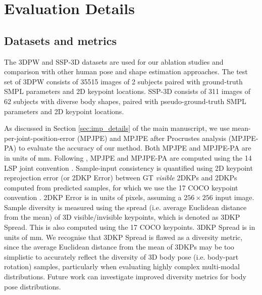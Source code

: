 \section{Evaluation Details}
\label{sec:supmat_eval_details}

\subsection{Datasets and metrics}

The 3DPW \cite{vonMarcard2018} and SSP-3D \cite{STRAPS2020BMVC} datasets are used for our ablation studies and comparison with other human pose and shape estimation approaches. The test set of 3DPW consists of 35515 images of 2 subjects paired with ground-truth SMPL parameters and 2D keypoint locations. SSP-3D consists of 311 images of 62 subjects with diverse body shapes, paired with pseudo-ground-truth SMPL parameters and 2D keypoint locations.

As discussed in Section \ref{sec:imp_details} of the main manuscript, we use mean-per-joint-position-error (MPJPE) and MPJPE after Procrustes analysis (MPJPE-PA) to evaluate the accuracy of our method. Both MPJPE and MPJPE-PA are in units of mm. Following \cite{hmrKanazawa17, kolotouros2019spin, kolotouros2019cmr, kolotouros2021prohmr}, MPJPE and MPJPE-PA are computed using the 14 LSP joint convention \cite{Johnson11lsp}. Sample-input consistency is quantified using 2D keypoint reprojection error (or 2DKP Error) between GT \textit{visible} 2DKPs and 2DKPs computed from predicted samples, for which we use the 17 COCO keypoint convention \cite{Lin2014MicrosoftCC}. 2DKP Error is in units of pixels, assuming a $256 \times 256$ input image. Sample diversity is measured using the spread (i.e. average Euclidean distance from the mean) of 3D visible/invisible keypoints, which is denoted as 3DKP Spread. This is also computed using the 17 COCO keypoints. 3DKP Spread is in units of mm. We recognise that 3DKP Spread is flawed as a diversity metric, since the  average Euclidean distance from the mean of 3DKPs may be too simplistic to accurately reflect the diversity of 3D body pose (i.e. body-part rotation) samples, particularly when evaluating highly complex multi-modal distributions. Future work can investigate improved diversity metrics for body pose distributions.

